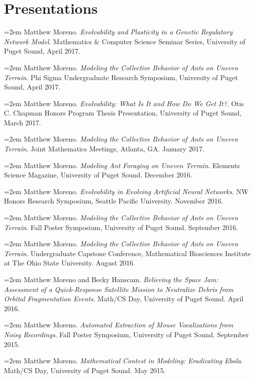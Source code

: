 \section{Presentations}
\hangindent=2em
Matthew Moreno. \textit{Evolvability and Plasticity in a Genetic Regulatory Network Model}. Mathematics \& Computer Science Seminar Series, University of Puget Sound, April 2017. 

\vspace {-3.5 mm}

\hangindent=2em
Matthew Moreno. \textit{Modeling the Collective Behavior of Ants on Uneven Terrain}. Phi Sigma Undergraduate Research Symposium, University of Puget Sound, April 2017.

\vspace {-3.5 mm}

\hangindent=2em
Matthew Moreno. \textit{Evolvability: What Is It and How Do We Get It?}. Otis C. Chapman Honors Program Thesis Presentation, University of Puget Sound, March 2017.

\vspace {-3.5 mm}

\hangindent=2em
Matthew Moreno. \textit{Modeling the Collective Behavior of Ants on Uneven Terrain}. Joint Mathematics Meetings, Atlanta, GA. January 2017.

\vspace {-3.5 mm}
\hangindent=2em
Matthew Moreno. \textit{Modeling Ant Foraging on Uneven Terrain}. Elements Science Magazine, University of Puget Sound. December 2016.

\vspace {-3.5 mm}
\hangindent=2em
Matthew Moreno. \textit{Evolvability in Evolving Artificial Neural Networks}. NW Honors Research Symposium, Seattle Pacific University. November 2016.

\vspace {-3.5 mm}
\hangindent=2em
Matthew Moreno. \textit{Modeling the Collective Behavior of Ants on Uneven Terrain}. Fall Poster Symposium, University of Puget Sound. September 2016.

\vspace {-3.5 mm}
\hangindent=2em
Matthew Moreno. \textit{Modeling the Collective Behavior of Ants on Uneven Terrain}. Undergraduate Capstone Conference, Mathematical Biosciences Institute at The Ohio State University. August 2016.

\vspace {-3.5 mm}
\hangindent=2em
Matthew Moreno and Becky Hanscam. \textit{Relieving the Space Jam: Assessment of
a Quick-Response Satellite Mission to Neutralize Debris from Orbital Fragmentation Events}. Math/CS Day, University of Puget Sound. April 2016.

\vspace {-3.5 mm}
\hangindent=2em
Matthew Moreno. \textit{Automated Extraction of Mouse Vocalizations from Noisy
Recordings}. Fall Poster Symposium, University of Puget Sound. September
2015.

\vspace {-3.5 mm}
\hangindent=2em
Matthew Moreno. \textit{Mathematical Contest in Modeling: Eradicating Ebola}.
Math/CS Day, University of Puget Sound. May 2015.


 \vspace {-3.5 mm}
